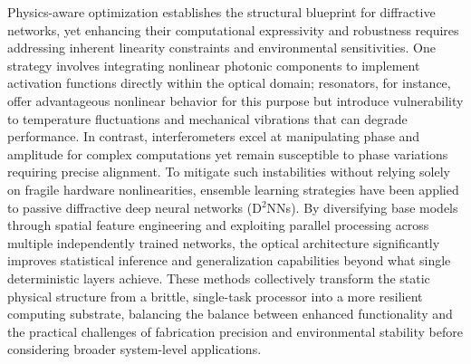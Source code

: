 Physics-aware optimization establishes the structural blueprint for diffractive networks, yet enhancing their computational expressivity and robustness requires addressing inherent linearity constraints and environmental sensitivities. One strategy involves integrating nonlinear photonic components to implement activation functions directly within the optical domain; resonators, for instance, offer advantageous nonlinear behavior for this purpose but introduce vulnerability to temperature fluctuations and mechanical vibrations that can degrade performance. In contrast, interferometers excel at manipulating phase and amplitude for complex computations yet remain susceptible to phase variations requiring precise alignment. To mitigate such instabilities without relying solely on fragile hardware nonlinearities, ensemble learning strategies have been applied to passive diffractive deep neural networks (D\(^{2}\)NNs). By diversifying base models through spatial feature engineering and exploiting parallel processing across multiple independently trained networks, the optical architecture significantly improves statistical inference and generalization capabilities beyond what single deterministic layers achieve. These methods collectively transform the static physical structure from a brittle, single-task processor into a more resilient computing substrate, balancing the balance between enhanced functionality and the practical challenges of fabrication precision and environmental stability before considering broader system-level applications. \citep{doi_10_3390_nano14080697_c372a140} \citep{doi_10_1038_s41377_020_00446_w_c890b40c}


